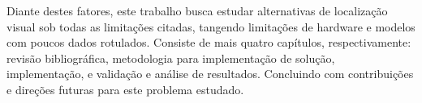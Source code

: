 Diante destes fatores, este trabalho busca estudar alternativas de localização visual sob todas as limitações citadas, tangendo limitações de hardware e modelos com poucos dados rotulados. Consiste de mais quatro capítulos, respectivamente: revisão bibliográfica, metodologia para implementação de solução, implementação, e validação e análise de resultados. Concluindo com contribuições e direções futuras para este problema estudado.